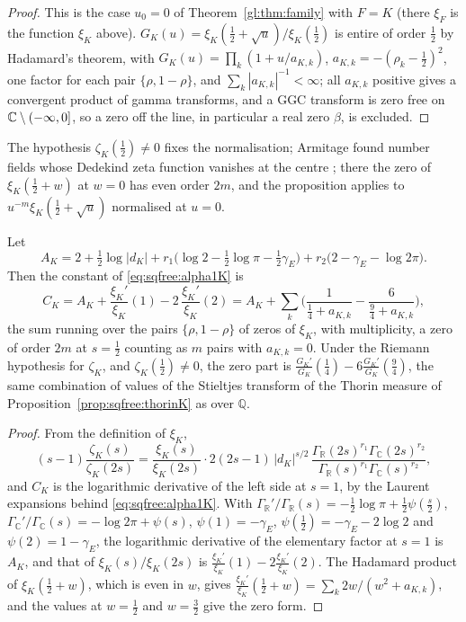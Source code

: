 \begin{proof}
This is the case $u_0=0$ of Theorem~\ref{gl:thm:family} with $F=K$ (there $\xi_F$ is the function $\xi_K$ above). $G_K(u)=\xi_K(\frac12+\sqrt u)/\xi_K(\frac12)$ is entire of order $\frac12$ by Hadamard's theorem, with $G_K(u)=\prod_k(1+u/a_{K,k})$, $a_{K,k}=-(\rho_k-\frac12)^2$, one factor for each pair $\{\rho,1-\rho\}$, and $\sum_k|a_{K,k}|^{-1}<\infty$; all $a_{K,k}$ positive gives a convergent product of gamma transforms, and a GGC transform is zero free on $\mathbb{C}\setminus(-\infty,0]$, so a zero off the line, in particular a real zero $\beta$, is excluded.
\end{proof}

The hypothesis $\zeta_K(\frac12)\ne0$ fixes the normalisation; Armitage found number fields whose Dedekind zeta function vanishes at the centre \cite{Armitage71}; there the zero of $\xi_K(\frac12+w)$ at $w=0$ has even order $2m$, and the proposition applies to $u^{-m}\xi_K(\frac12+\sqrt u)$ normalised at $u=0$.

\begin{theorem}\label{thm:sqfree:constK}
Let
\[
A_K=2+\tfrac12\log|d_K|+r_1\big(\log2-\tfrac12\log\pi-\tfrac12\gamma_E\big)+r_2\big(2-\gamma_E-\log2\pi\big).
\]
Then the constant of \eqref{eq:sqfree:alpha1K} is
\[
C_K=A_K+\frac{\xi_K'}{\xi_K}(1)-2\,\frac{\xi_K'}{\xi_K}(2)=A_K+\sum_k\Big(\frac1{\frac14+a_{K,k}}-\frac6{\frac94+a_{K,k}}\Big),
\]
the sum running over the pairs $\{\rho,1-\rho\}$ of zeros of $\xi_K$, with multiplicity, a zero of order $2m$ at $s=\frac12$ counting as $m$ pairs with $a_{K,k}=0$. Under the Riemann hypothesis for $\zeta_K$, and $\zeta_K(\frac12)\ne0$, the zero part is $\frac{G_K'}{G_K}(\frac14)-6\frac{G_K'}{G_K}(\frac94)$, the same combination of values of the Stieltjes transform of the Thorin measure of Proposition~\ref{prop:sqfree:thorinK} as over $\mathbb Q$.
\end{theorem}

\begin{proof}
From the definition of $\xi_K$,
\[
(s-1)\frac{\zeta_K(s)}{\zeta_K(2s)}=\frac{\xi_K(s)}{\xi_K(2s)}\cdot2(2s-1)\,|d_K|^{s/2}\,\frac{\Gamma_{\mathbb R}(2s)^{r_1}\Gamma_{\mathbb C}(2s)^{r_2}}{\Gamma_{\mathbb R}(s)^{r_1}\Gamma_{\mathbb C}(s)^{r_2}},
\]
and $C_K$ is the logarithmic derivative of the left side at $s=1$, by the Laurent expansions behind \eqref{eq:sqfree:alpha1K}. With $\Gamma_{\mathbb R}'/\Gamma_{\mathbb R}(s)=-\frac12\log\pi+\frac12\psi(\frac s2)$, $\Gamma_{\mathbb C}'/\Gamma_{\mathbb C}(s)=-\log2\pi+\psi(s)$, $\psi(1)=-\gamma_E$, $\psi(\frac12)=-\gamma_E-2\log2$ and $\psi(2)=1-\gamma_E$, the logarithmic derivative of the elementary factor at $s=1$ is $A_K$, and that of $\xi_K(s)/\xi_K(2s)$ is $\frac{\xi_K'}{\xi_K}(1)-2\frac{\xi_K'}{\xi_K}(2)$. The Hadamard product of $\xi_K(\frac12+w)$, which is even in $w$, gives $\frac{\xi_K'}{\xi_K}(\frac12+w)=\sum_k2w/(w^2+a_{K,k})$, and the values at $w=\frac12$ and $w=\frac32$ give the zero form.
\end{proof}

